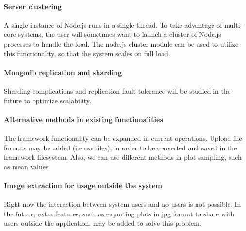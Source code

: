 \paragraph{Server clustering}  A single instance of Node.js runs in a single thread. To take advantage of multi-core systems, the user will sometimes want to launch a cluster of Node.js processes to handle the load. The node.js cluster module can be used to utilize this functionality, so that the system scales on full load.

\paragraph{Mongodb replication and sharding} Sharding complications and replication fault tolerance will be studied in the future to optimize scalability.

\paragraph{Alternative methods in existing functionalities}
The framework functionality can be expanded in current operations. Upload file formats may be added (i.e csv files), in order to be converted and saved in the framework filesystem. Also, we can use different methods in plot sampling, such as mean values.
 
\paragraph{Image extraction for usage outside the system}
Right now the interaction between system users and no users is not possible. In the future, extra features, such as exporting plots in jpg format to share with users outside the application, may be added to solve this problem.

	